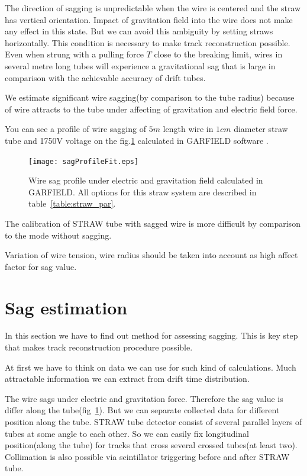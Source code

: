 	The direction of sagging is unpredictable when the wire is centered and the straw has vertical orientation. Impact of gravitation field into the wire does not make any effect in this state. But we can avoid this ambiguity by setting straws horizontally. This condition is necessary to make track reconstruction possible.
	Even when strung with a pulling force $T$ close to the breaking limit, wires in several metre long tubes will experience a gravitational sag that is large in comparison with the achievable accuracy of drift tubes.
	
	
	We estimate significant wire sagging(by comparison to the tube radius) because of wire attracts to the tube under affecting of gravitation and electric field force.
	
	You can see a profile of wire sagging of $5m$ length wire in $1cm$ diameter straw tube and 1750V voltage on the fig.\ref{fig:sagProfile} calculated in GARFIELD software \cite{garfield}.
	
	\begin{figure}[h!]
	\centering
	\texttt{[image: sagProfileFit.eps]}
	\caption{Wire sag profile under electric and gravitation field calculated in GARFIELD. All options for this straw system are described in table~\ref{table:straw_par}.}
	\label{fig:sagProfile}
	\end{figure}	
	
	The calibration of STRAW tube with sagged wire is more difficult by comparison to the mode without sagging. 
	
	Variation of wire tension, wire radius should be taken into account as high affect factor for sag value.
	
	\section{Sag estimation}

	In this section we have to find out method for assessing sagging. This is key step that makes track reconstruction procedure possible.
	
	At first we have to think on data we can use for such kind of calculations. Much attractable information we can extract from drift time distribution. 
	
	The wire sags under electric and gravitation force. Therefore the sag value is differ along the tube(fig~\ref{fig:sagProfile}). But we can separate collected data for different position along the tube. STRAW tube detector consist of several parallel layers of tubes at some angle to each other. So we can easily fix longitudinal position(along the tube)  for tracks that cross several crossed tubes(at least two). Collimation is also possible via scintillator triggering before and after STRAW tube.
	
